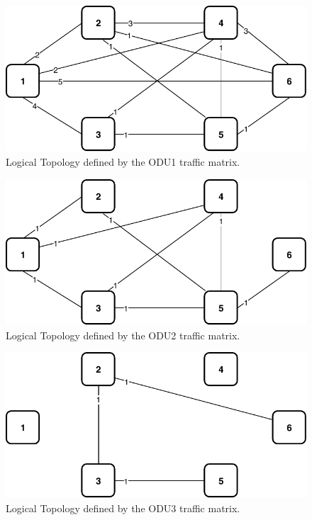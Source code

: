 \begin{figure}[h!]
\centering
\includegraphics[width=12cm]{sdf/ilp/opaque_survivability/figures/logical_topology_ODU1_low}
\caption{Logical Topology defined by the ODU1 traffic matrix.}
\label{logical_ODU1_low}
\end{figure}

\begin{figure}[h!]
\centering
\includegraphics[width=12cm]{sdf/ilp/opaque_survivability/figures/logical_topology_ODU2_low}
\caption{Logical Topology defined by the ODU2 traffic matrix.}
\label{logical_ODU2_low}
\end{figure}

\begin{figure}[h!]
\centering
\includegraphics[width=12cm]{sdf/ilp/opaque_survivability/figures/logical_topology_ODU3_low}
\caption{Logical Topology defined by the ODU3 traffic matrix.}
\label{logical_ODU3_low}
\end{figure}

